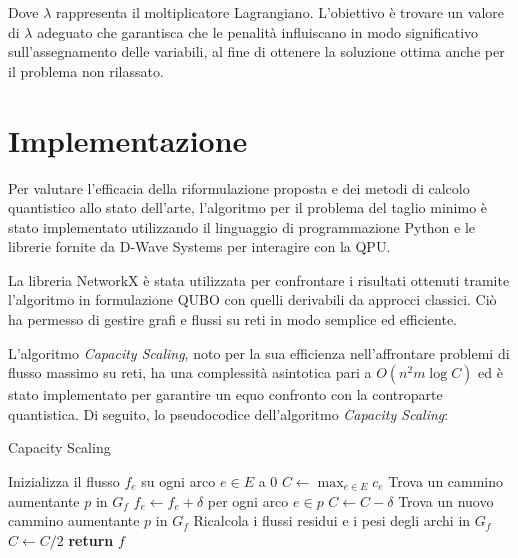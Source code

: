 \documentclass{article}
\begin{document}
Dove $\lambda$ rappresenta il moltiplicatore Lagrangiano. L'obiettivo è trovare un valore di $\lambda$ adeguato che garantisca che le penalità influiscano in modo significativo sull'assegnamento delle variabili, al fine di ottenere la soluzione ottima anche per il problema non rilassato.
\pagebreak

\section{Implementazione}

Per valutare l'efficacia della riformulazione proposta e dei metodi di calcolo quantistico allo stato dell'arte, l'algoritmo per il problema del taglio minimo è stato implementato utilizzando il linguaggio di programmazione Python e le librerie fornite da D-Wave Systems per interagire con la QPU\cite{dwave}.

La libreria NetworkX\cite{networkx} è stata utilizzata per confrontare i risultati ottenuti tramite l'algoritmo in formulazione QUBO con quelli derivabili da approcci classici. 
Ciò ha permesso di gestire grafi e flussi su reti in modo semplice ed efficiente.

L'algoritmo \emph{Capacity Scaling}, noto per la sua efficienza nell'affrontare problemi di flusso massimo su reti, ha una complessità asintotica pari a $O(n^2 m \log C)$ ed è stato implementato per garantire un equo confronto con la controparte quantistica.
Di seguito, lo pseudocodice dell'algoritmo \emph{Capacity Scaling}:

\begin{algorithm}
\caption{Capacity Scaling}
    \begin{algorithmic}[1]
        \State Inizializza il flusso $f_e$ su ogni arco $e \in E$ a 0
        \State $C \gets \max_{e \in E} c_e$
            \State Trova un cammino aumentante $p$ in $G_f$
                \State $f_e \gets f_e + \delta$ per ogni arco $e \in p$
                \State $C \gets C - \delta$
                \State Trova un nuovo cammino aumentante $p$ in $G_f$
            \EndWhile
            \State Ricalcola i flussi residui e i pesi degli archi in $G_f$
            \State $C \gets C/2$
        \EndWhile
        \State \textbf{return} $f$
    \EndProcedure
\end{algorithmic}
\end{algorithm}
\end{document}
